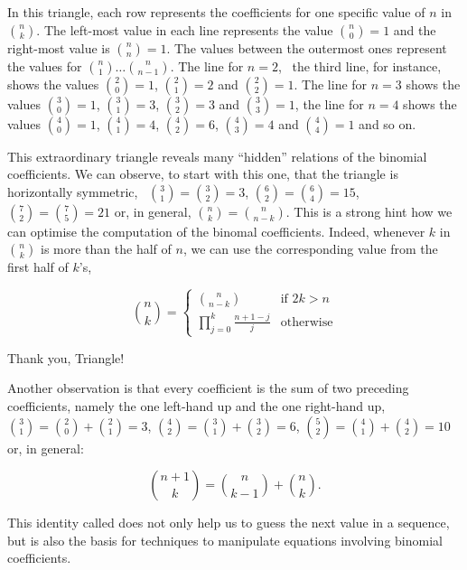 \documentclass{scrreprt}
\begin{document}
In this triangle, each row represents 
the coefficients for one specific value of $n$ in $\binom{n}{k}$.
The left-most value in each line
represents the value $\binom{n}{0} = 1$
and the right-most value is $\binom{n}{n} = 1$. 
The values between the outermost ones
represent the values for $\binom{n}{1} \dots \binom{n}{n-1}$.
The line for $n = 2$, \ie\ the third line, for instance,
shows the values 
$\binom{2}{0} = 1$, $\binom{2}{1} = 2$ and $\binom{2}{2} = 1$.
The line for $n = 3$ shows the values
$\binom{3}{0} = 1$, 
$\binom{3}{1} = 3$,
$\binom{3}{2} = 3$ and
$\binom{3}{3} = 1$,
the line for $n = 4$ shows the values
$\binom{4}{0} = 1$, 
$\binom{4}{1} = 4$,
$\binom{4}{2} = 6$, 
$\binom{4}{3} = 4$ and
$\binom{4}{4} = 1$ and so on.

This extraordinary triangle
reveals many ``hidden'' relations of the binomial coefficients.
We can observe, to start with this one,
that the triangle is horizontally symmetric,
\ie\ $\binom{3}{1} = \binom{3}{2} =  3$,
     $\binom{6}{2} = \binom{6}{4} = 15$,
     $\binom{7}{2} = \binom{7}{5} = 21$
or, in general, 
$\binom{n}{k} = \binom{n}{n-k}$.
This is a strong hint 
how we can optimise 
the computation of the binomal coefficients.
Indeed, whenever $k$ in $\binom{n}{k}$
is more than the half of $n$,
we can use the corresponding value
from the first half of $k$'s,
\ie\ 

\begin{equation}
\binom{n}{k} = \begin{cases}
                 \binom{n}{n-k} & \textrm{if $2k > n$}\\
                 \prod_{j=0}^{k}{\frac{n + 1 - j}{j}} & \textrm{otherwise}
               \end{cases}
\end{equation}

Thank you, Triangle!

Another observation is
that every coefficient is the sum
of two preceding coefficients,
namely the one left-hand up and the one right-hand up,
\eg\
$\binom{3}{1} = \binom{2}{0} + \binom{2}{1} =  3$,
$\binom{4}{2} = \binom{3}{1} + \binom{3}{2} =  6$,
$\binom{5}{2} = \binom{4}{1} + \binom{4}{2} = 10$
or, in general:

\begin{equation}\label{eq:binomPascalRule}
\binom{n+1}{k} = \binom{n}{k-1} + \binom{n}{k}.
\end{equation}

This identity called 
does not only help us to guess the next value
in a sequence,
but is also the basis for techniques
to manipulate equations involving binomial coefficients.
\end{document}
